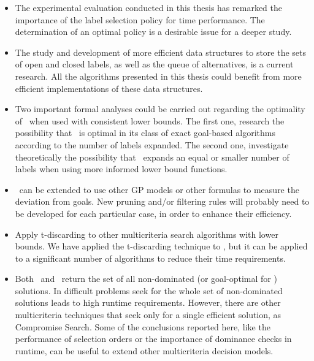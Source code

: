 \begin{itemize}

	\item The experimental evaluation conducted in this thesis has remarked the importance of the label selection policy for time performance. The determination of an optimal policy is a desirable issue for a deeper study.  
	
	\item The study and development of more efficient data structures to store the sets of open and closed labels, as well as the queue of alternatives, is a current research. All the algorithms presented in this thesis could benefit from more efficient implementations of these data structures.

	\item Two important formal analyses could be carried out regarding the optimality of \lexgo \ when used with consistent lower bounds. The first one, research the possibility that \lexgo \ is optimal in its class of exact goal-based algorithms according to the number of labels expanded. The second one, investigate theoretically the possibility that \lexgo \ expands an equal or smaller number of labels when using more informed lower bound functions.

	\item \lexgo \ can be extended to use other GP models or other formulas to measure the deviation from goals. New pruning and/or filtering rules will probably need to be developed for each particular case, in order to enhance their efficiency.
	
    \item Apply t-discarding to other multicriteria search algorithms with lower bounds. We have applied the t-discarding technique to \namoa, but it can be applied to a significant number of algorithms to reduce their time requirements.  
	
	\item Both \namoa \ and \lexgo \ return the set of all non-dominated (or goal-optimal for \lexgo) solutions. In difficult problems seek for the whole set of non-dominated solutions leads to high runtime requirements. However, there are other multicriteria techniques that seek only for a single efficient solution, as Compromise Search. Some of the conclusions reported here, like the performance of selection orders or the importance of dominance checks in runtime, can be useful to extend other multicriteria decision models.
	

\end{itemize}
